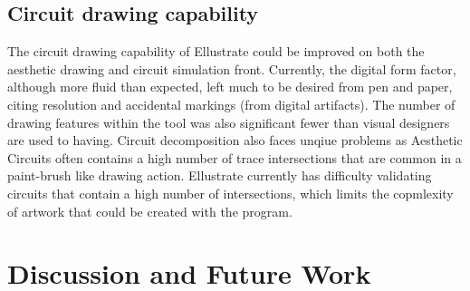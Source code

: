 \documentclass{sigchi}
\begin{document}
\subsection{Circuit drawing capability}
The circuit drawing capability of Ellustrate could be improved on both the aesthetic drawing and circuit simulation front. Currently, the digital form factor, although more fluid than expected, left much to be desired from pen and paper, citing resolution and accidental markings (from digital artifacts). The number of drawing features within the tool was also significant fewer than visual designers are used to having. Circuit decomposition also faces unqiue problems as Aesthetic Circuits often contains a high number of trace intersections that are common in a paint-brush like drawing action. Ellustrate currently has difficulty validating circuits that contain a high number of intersections, which limits the copmlexity of artwork that could be created with the program. 


\newpage
\section {Discussion and Future Work}

\end{document}
